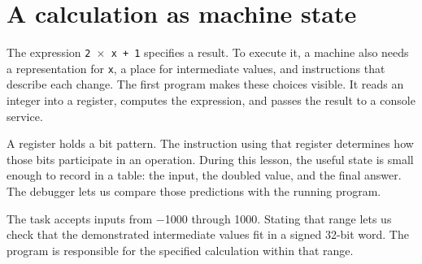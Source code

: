 \section{A calculation as machine
  state}\label{001-console-calculation-p00-a-calculation-as-machine-state}

The expression \texttt{2\ \ensuremath{\times}\ x\ +\ 1} specifies a result. To execute it,
a machine also needs a representation for \texttt{x}, a place for
intermediate values, and instructions that describe each change. The
first program makes these choices visible. It reads an integer into a
register, computes the expression, and passes the result to a console
service.

A register holds a bit pattern. The instruction using that register
determines how those bits participate in an operation. During this
lesson, the useful state is small enough to record in a table: the
input, the doubled value, and the final answer. The debugger lets us
compare those predictions with the running program.

The task accepts inputs from \ensuremath{-}1000 through 1000. Stating that range lets
us check that the demonstrated intermediate values fit in a signed
32-bit word. The program is responsible for the specified calculation
within that range.

